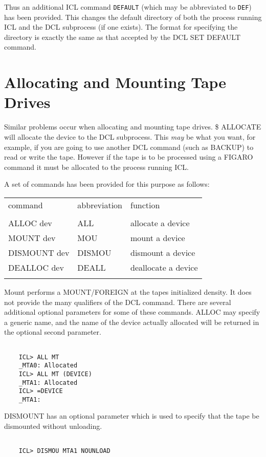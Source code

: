 \documentclass[twoside,11pt]{report}
\newcommand{\xlabel}[1]{}
\begin{document}
Thus an additional ICL command \verb+DEFAULT+ (which may be abbreviated
to \verb+DEF+) has been provided. This changes the default directory of
both the process running ICL and the DCL subprocess (if one exists). The
format for specifying the directory is exactly the same as that accepted
by the DCL SET DEFAULT command.

\section{\xlabel{allocating_and_mounting_tape_drives}Allocating and Mounting Tape Drives}
Similar problems occur when allocating and mounting tape drives.
\$ ALLOCATE will allocate the device to the DCL subprocess. This {\em may}
be what you want, for example, if you are going to use another DCL
command (such as BACKUP) to read or write the tape. However if the tape
is to be processed using a FIGARO command it must be allocated to the
process running ICL.

A set of commands has been provided for this purpose as follows:

\begin{center}
\begin{tabular}{lll}
\\
command & abbreviation & function\\
\\
ALLOC dev & ALL & allocate a device\\
MOUNT dev & MOU & mount a device\\
DISMOUNT dev & DISMOU & dismount a device\\
DEALLOC dev & DEALL & deallocate a device\\
\\
\end{tabular}
\end{center}
Mount performs a MOUNT/FOREIGN at the tapes initialized density. It does
not provide the many qualifiers of the DCL command. There are several
additional optional parameters for some of these commands. ALLOC may
specify a generic name, and the name of the device actually allocated
will be returned in the optional second parameter.
\begin{verbatim}

    ICL> ALL MT
    _MTA0: Allocated
    ICL> ALL MT (DEVICE)
    _MTA1: Allocated
    ICL> =DEVICE
    _MTA1:

\end{verbatim}
DISMOUNT has an optional parameter which is used to specify that the
tape be dismounted without unloading.
\begin{verbatim}

    ICL> DISMOU MTA1 NOUNLOAD

\end{verbatim}
\end{document}
